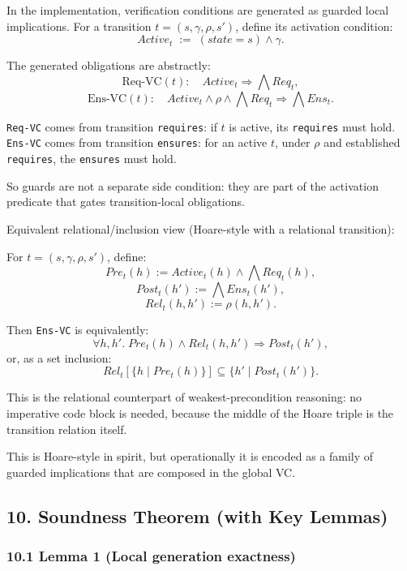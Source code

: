 \documentclass[
]{article}
\providecommand{\coloneqq}{:=}
\begin{document}
In the implementation, verification conditions are generated as guarded
local implications. For a transition \(t=(s,\gamma,\rho,s')\), define
its activation condition: \[
Active_t \;\coloneqq\; (state=s)\land \gamma.
\]

The generated obligations are abstractly: \[
\mathrm{Req\text{-}VC}(t):\quad Active_t \Rightarrow \bigwedge Req_t,
\] \[
\mathrm{Ens\text{-}VC}(t):\quad Active_t \land \rho \land \bigwedge Req_t \Rightarrow \bigwedge Ens_t.
\]

\texttt{Req-VC} comes from transition \texttt{requires}: if \(t\) is
active, its \texttt{requires} must hold.\\
\texttt{Ens-VC} comes from transition \texttt{ensures}: for an active
\(t\), under \(\rho\) and established \texttt{requires}, the
\texttt{ensures} must hold.

So guards are not a separate side condition: they are part of the
activation predicate that gates transition-local obligations.

Equivalent relational/inclusion view (Hoare-style with a relational
transition):

For \(t=(s,\gamma,\rho,s')\), define: \[
Pre_t(h)\coloneqq Active_t(h)\land \bigwedge Req_t(h),
\] \[
Post_t(h')\coloneqq \bigwedge Ens_t(h'),
\] \[
Rel_t(h,h')\coloneqq \rho(h,h').
\]

Then \texttt{Ens-VC} is equivalently: \[
\forall h,h'.\; Pre_t(h)\land Rel_t(h,h')\Rightarrow Post_t(h'),
\] or, as a set inclusion: \[
Rel_t[\{h\mid Pre_t(h)\}] \subseteq \{h'\mid Post_t(h')\}.
\]

This is the relational counterpart of weakest-precondition reasoning: no
imperative code block is needed, because the middle of the Hoare triple
is the transition relation itself.

This is Hoare-style in spirit, but operationally it is encoded as a
family of guarded implications that are composed in the global VC.

\subsection{10. Soundness Theorem (with Key
Lemmas)}\label{soundness-theorem-with-key-lemmas}

\subsubsection{10.1 Lemma 1 (Local generation
exactness)}\label{lemma-1-local-generation-exactness}
\end{document}
